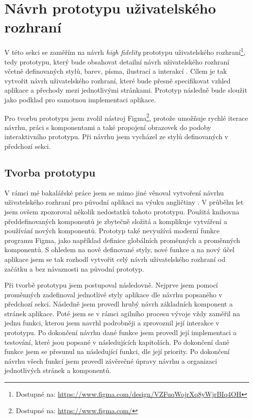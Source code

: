 \section{Návrh prototypu uživatelského rozhraní}

V této sekci se zaměřím na návrh \textit{high fidelity} prototypu uživatelského rozhraní\footnote{Dostupné na: \href{https://www.figma.com/design/VZFuqWojrXq8yWjrBIq4OH}{https://www.figma.com/design/VZFuqWojrXq8yWjrBIq4OH}}, tedy prototypu, který bude obsahovat detailní návrh uživatelského rozhraní včetně definovaných stylů, barev, písma, ilustrací a interakcí \cite[53-54]{NURUIDesignSteps}. Cílem je tak vytvořit návrh uživatelského rozhraní, které bude přesně specifikovat vzhled aplikace a přechody mezi jednotlivými stránkami. Prototyp následně bude sloužit jako podklad pro samotnou implementaci aplikace.

Pro tvorbu prototypu jsem zvolil nástroj Figma\footnote{Dostupné na: \href{https://www.figma.com/}{https://www.figma.com/}}, protože umožňuje rychlé iterace návrhu, práci s komponentami a také propojení obrazovek do podoby interaktivního prototypu. Při návrhu jsem vycházel ze stylů definovaných v předchozí sekci.

\subsection{Tvorba prototypu}

V rámci mé bakalářské práce jsem se mimo jiné věnoval vytvoření návrhu uživatelského rozhraní pro původní aplikaci na výuku angličtiny \cite{Jenicek2024BachelorThesis}. V průběhu let jsem ovšem zpozoroval několik nedostatků tohoto prototypu. Použitá knihovna předdefinovaných komponentů je zbytečně složitá a komplikuje vytváření a používání nových komponentů. Prototyp také nevyužívá moderní funkce programu Figma, jako například definice globálních proměnných a proměnných komponentů. S ohledem na nově definované styly, nové funkce a na nový účel aplikace jsem se tak rozhodl vytvořit celý návrh uživatelského rozhraní od začátku a bez návaznosti na původní prototyp.

Při tvorbě prototypu jsem postupoval následovně. Nejprve jsem pomocí proměnných zadefinoval jednotlivé styly aplikace dle návrhu popsaného v předchozí sekci. Následně jsem provedl hrubý návrh základních komponent a stránek aplikace. Poté jsem se v rámci agilního procesu vývoje vždy zaměřil na jednu funkci, kterou jsem navrhl podrobněji a zprovoznil její interakce v prototypu. Po dokončení návrhu dané funkce jsem provedl její implementaci a testování, které jsou popsané v následujících kapitolách. Po dokončení dané funkce jsem se přesunul na následující funkci, dle její priority. Po dokončení návrhu všech funkcí jsem provedl závěrečné úpravy návrhu a organizaci jednotlivých stránek a komponentů.

